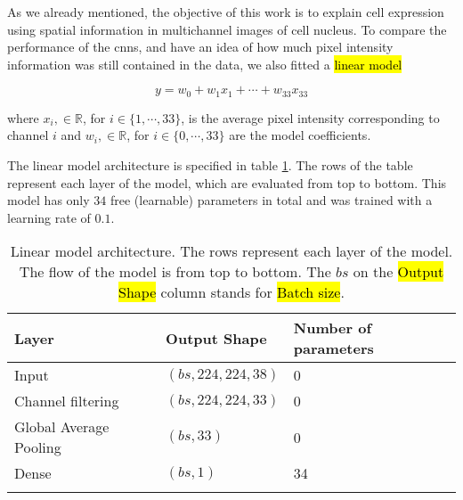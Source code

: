 

\graphicspath{{./Sections/Methodology/Resources/}}


As we already mentioned, the objective of this work is to explain cell expression using spatial information in multichannel images of cell nucleus. To compare the performance of the \glspl{cnn}, and have an idea of how much pixel intensity information was still contained in the data, we also fitted a  \hl{linear model}

\begin{equation}
  y = w_0 + w_1x_1 + \cdots + w_{33}x_{33}
\end{equation}

\noindent where $x_i, \in \mathbb{R}$, for $i \in \{1, \cdots, 33\}$, is the average pixel intensity corresponding to channel $i$ and $w_i, \in \mathbb{R}$, for $i \in \{0, \cdots, 33\}$ are the model coefficients.

The linear model architecture is specified in table \ref{table:metho:models:lm}. The rows of the table represent each layer of the model, which are evaluated from top to bottom. This model has only $34$ free (learnable) parameters in total and was trained with a learning rate of $0.1$.

\setlength{\mylinewidth}{\linewidth-7pt}%
\setlength{\mylengtha}{0.35\mylinewidth-2\arraycolsep}%
\setlength{\mylengthb}{0.25\mylinewidth-2\arraycolsep}%
\setlength{\mylengthc}{0.18\mylinewidth-2\arraycolsep}%

\begin{longtable}{m{\mylengtha} | m{\mylengthb} | m{\mylengthc}}
    \hline
    Layer & Output Shape & Number of parameters \\
    \hline
    Input & $(bs, 224, 224, 38)$ & 0 \\
    \hline
    Channel filtering & $(bs, 224, 224, 33)$ & 0 \\
    \hline
    Global Average Pooling & $(bs, 33)$ & 0 \\
    \hline
    Dense & $(bs, 1)$ & 34 \\
    \hline
  \caption{Linear model architecture. The rows represent each layer of the model. The flow of the model is from top to bottom. The $bs$ on the \hl{Output Shape} column stands for \hl{Batch size}.}
  \label{table:metho:models:lm}
\end{longtable}
